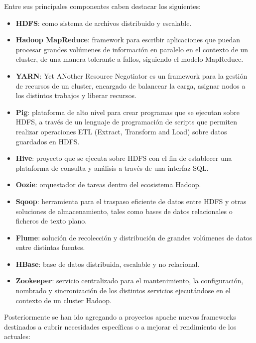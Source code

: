 Entre sus principales componentes caben destacar los siguientes:

\begin{itemize}
\item \textbf{\acf{HDFS}}: como sistema de archivos
  distribuido y escalable. 
\item \textbf{Hadoop MapReduce}: framework para escribir aplicaciones que puedan
  procesar grandes volúmenes de información en paralelo en el contexto de un
  cluster, de una manera tolerante a fallos, siguiendo el modelo MapReduce. 
\item \textbf{YARN}: Yet ANother Resource Negotiator es un framework para la
  gestión de recursos de un cluster, encargado de balancear la carga, asignar
  nodos a los distintos trabajos y liberar recursos. 
\item \textbf{Pig}: plataforma de alto nivel para crear programas que se
  ejecutan sobre \acs{HDFS}, a través de un lenguaje de programación de scripts que
  permiten realizar operaciones ETL (Extract, Transform and Load) sobre datos
  guardados en \acs{HDFS}. 
\item \textbf{Hive}: proyecto que se ejecuta sobre \acs{HDFS} con el fin de establecer
  una plataforma de consulta y análisis a través de una interfaz SQL. 
\item \textbf{Oozie}: orquestador de tareas dentro del ecosistema Hadoop. 
\item \textbf{Sqoop}: herramienta para el traspaso eficiente de datos entre \acs{HDFS}
  y otras soluciones de almacenamiento, tales como bases de datos relacionales o
  ficheros de texto plano. 

\item \textbf{Flume}: solución de recolección y distribución de grandes
  volúmenes de datos entre distintas fuentes.
\item \textbf{HBase}: base de datos distribuida, escalable y no relacional. 
\item \textbf{Zookeeper}: servicio centralizado para el mantenimiento, la
  configuración, nombrado y sincronización de los distintos servicios
  ejecutándose en el contexto de un cluster Hadoop. 
\end{itemize}

Posteriormente se han ido agregando a proyectos apache nuevos frameworks
destinados a cubrir necesidades específicas o a mejorar el rendimiento de los
actuales:

